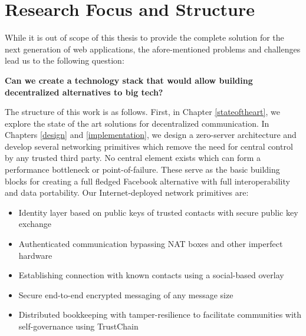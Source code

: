 \section{Research Focus and Structure}

While it is out of scope of this thesis to provide the complete solution for the next generation of web applications, the afore-mentioned problems and challenges lead us to the following question:

\begin{displayquote}
\textbf{Can we create a technology stack that would allow building decentralized alternatives to big tech?}
\end{displayquote}

The structure of this work is as follows. First, in Chapter \ref{stateoftheart}, we explore the state of the art solutions for decentralized communication. In Chapters \ref{design} and \ref{implementation}, we design a zero-server architecture and develop several networking primitives which remove the need for central control by any trusted third party. No central element exists which can form a performance bottleneck or point-of-failure. These serve as the basic building blocks for creating a full fledged Facebook alternative with full interoperability and data portability. %
Our Internet-deployed network primitives are:

\begin{itemize}
    \item Identity layer based on public keys of trusted contacts with secure public key exchange
    \item Authenticated communication bypassing NAT boxes and other imperfect hardware
    \item Establishing connection with known contacts using a social-based overlay %
    \item Secure end-to-end encrypted messaging of any message size
    \item Distributed bookkeeping with tamper-resilience to facilitate communities with self-governance using TrustChain
\end{itemize}

